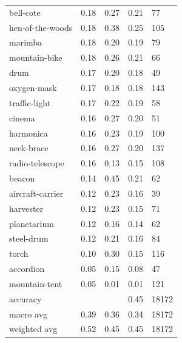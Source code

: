 \begin{center}
\begin{longtable}{lllll}
bell-cote & 0.18 & 0.27 & 0.21 & 77 \\
hen-of-the-woods & 0.18 & 0.38 & 0.25 & 105 \\
marimba & 0.18 & 0.20 & 0.19 & 79 \\
mountain-bike & 0.18 & 0.26 & 0.21 & 66 \\
drum & 0.17 & 0.20 & 0.18 & 49 \\
oxygen-mask & 0.17 & 0.18 & 0.18 & 143 \\
traffic-light & 0.17 & 0.22 & 0.19 & 58 \\
cinema & 0.16 & 0.27 & 0.20 & 51 \\
harmonica & 0.16 & 0.23 & 0.19 & 100 \\
neck-brace & 0.16 & 0.27 & 0.20 & 137 \\
radio-telescope & 0.16 & 0.13 & 0.15 & 108 \\
beacon & 0.14 & 0.45 & 0.21 & 62 \\
aircraft-carrier & 0.12 & 0.23 & 0.16 & 39 \\
harvester & 0.12 & 0.23 & 0.15 & 71 \\
planetarium & 0.12 & 0.16 & 0.14 & 62 \\
steel-drum & 0.12 & 0.21 & 0.16 & 84 \\
torch & 0.10 & 0.30 & 0.15 & 116 \\
accordion & 0.05 & 0.15 & 0.08 & 47 \\
mountain-tent & 0.05 & 0.01 & 0.01 & 121 \\
\midrule
accuracy &  &  & 0.45 & 18172 \\
macro avg & 0.39 & 0.36 & 0.34 & 18172 \\
weighted avg & 0.52 & 0.45 & 0.45 & 18172 \\
\bottomrule
\end{longtable}
\end{center}
